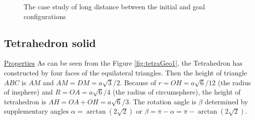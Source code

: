 \begin{figure}[H]
\centering
{}
\hfill
{}
\caption{The case study of long distance between the initial and goal configurations}
\label{fig:cubeLongDist}
\end{figure}
\clearpage
\newpage
\subsection{Tetrahedron solid}
\noindent\uline{Properties} 
As can be seen from the Figure \ref{fig:tetraGeo1}, the Tetrahedron has constructed by four faces of the equilateral triangles. Then the height of triangle $ABC$ is $AM$ and $AM=DM=a\sqrt{3}/2$.
Because of $r=OH=a\sqrt{6}/12$ (the radius of insphere) and $R=OA=a\sqrt{6}/4$ (the radius of circumsphere), the height of tetrahedron is $AH=OA+OH=a\sqrt{6}/3$. The rotation angle is $\beta$ determined by supplementary angles $\alpha=\arctan(2\sqrt{2})$ or $\beta=\pi-\alpha = \pi-\arctan(2\sqrt{2})$.
 

